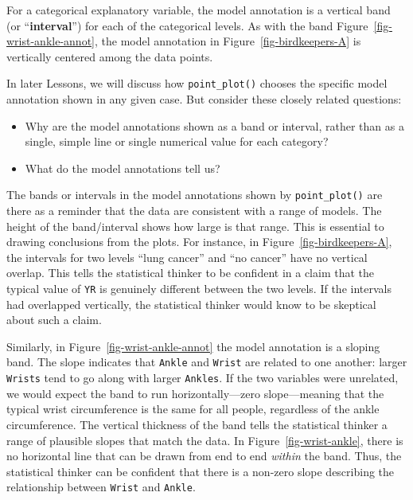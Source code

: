 \documentclass[
  letterpaper,
  DIV=11,
  numbers=noendperiod,
  oneside]{scrartcl}
\providecommand{\tightlist}{%
  \setlength{\itemsep}{0pt}\setlength{\parskip}{0pt}}\usepackage{longtable,booktabs,array}
\begin{document}
For a categorical explanatory variable, the model annotation is a
vertical band (or ``\textbf{interval}'') for each of the categorical
levels. As with the band Figure~\ref{fig-wrist-ankle-annot}, the model
annotation in Figure~\ref{fig-birdkeepers-A} is vertically centered
among the data points.

In later Lessons, we will discuss how \texttt{point\_plot()} chooses the
specific model annotation shown in any given case. But consider these
closely related questions:

\begin{itemize}
\tightlist
\item
  Why are the model annotations shown as a band or interval, rather than
  as a single, simple line or single numerical value for each category?
\item
  What do the model annotations tell us?
\end{itemize}

The bands or intervals in the model annotations shown by
\texttt{point\_plot()} are there as a reminder that the data are
consistent with a range of models. The height of the band/interval shows
how large is that range. This is essential to drawing conclusions from
the plots. For instance, in Figure~\ref{fig-birdkeepers-A}, the
intervals for two levels ``lung cancer'' and ``no cancer'' have no
vertical overlap. This tells the statistical thinker to be confident in
a claim that the typical value of \texttt{YR} is genuinely different
between the two levels. If the intervals had overlapped vertically, the
statistical thinker would know to be skeptical about such a claim.

Similarly, in Figure~\ref{fig-wrist-ankle-annot} the model annotation is
a sloping band. The slope indicates that \texttt{Ankle} and
\texttt{Wrist} are related to one another: larger \texttt{Wrists} tend
to go along with larger \texttt{Ankles}. If the two variables were
unrelated, we would expect the band to run horizontally---zero
slope---meaning that the typical wrist circumference is the same for all
people, regardless of the ankle circumference. The vertical thickness of
the band tells the statistical thinker a range of plausible slopes that
match the data. In Figure~\ref{fig-wrist-ankle}, there is no horizontal
line that can be drawn from end to end \emph{within} the band. Thus, the
statistical thinker can be confident that there is a non-zero slope
describing the relationship between \texttt{Wrist} and \texttt{Ankle}.
\end{document}
